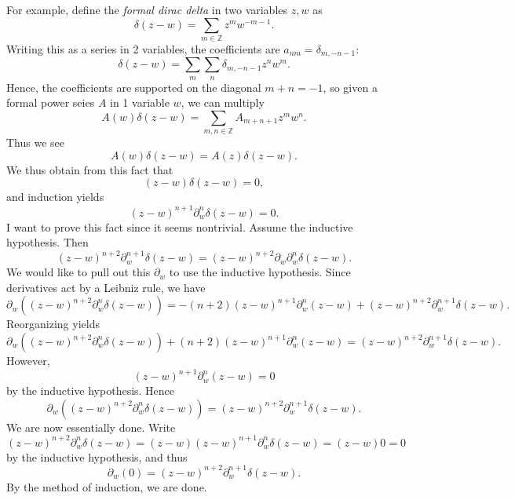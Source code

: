 For example, define the \emph{formal dirac delta} in two variables $z,w$ as
\[
	\delta (z-w) = \sum_{m\in\mathbb{Z} } z^m w^{-m-1} 
.\]
Writing this as a series in 2 variables, the coefficients are $a_{nm} =\delta _{m,-n-1} $:
\[
	\delta (z-w) = \sum_{m} \sum_{n} \delta _{m,-n-1} z^nw^{m} 
.\]
Hence, the coefficients are supported on the diagonal $m+n=-1$, so given a formal power seies $A$ in 1 variable $w$, we can multiply
\[
	A(w)\delta (z-w) = \sum_{m,n\in\mathbb{Z} } A_{m+n+1} z^mw^n
.\]
Thus we see
\[
	A(w)\delta (z-w) = A(z)\delta (z-w)
.\]
We thus obtain from this fact that
\[
	(z-w)\delta (z-w)=0,
\]
and induction yields
\[
	(z-w)^{n+1} \partial ^n_w \delta (z-w)=0
.\]
I want to prove this fact since it seems nontrivial. Assume the inductive hypothesis. Then
\[
	(z-w)^{n+2} \partial _{w} ^{n+1} \delta (z-w) = (z-w)^{n+2} \partial _w \partial _w^{n} \delta (z-w)
.\]
We would like to pull out this $\partial _w$ to use the inductive hypothesis. Since derivatives act by a Leibniz rule, we have
\[
	\partial _w\left( (z-w)^{n+2} \partial _w^n \delta (z-w) \right) =-(n+2)(z-w)^{n+1} \partial _w^n(z-w) + (z-w)^{n+2} \partial _w^{n+1} \delta (z-w)
.\]
Reorganizing yields
\[
	\partial _w\left( (z-w)^{n+2} \partial _w^n \delta (z-w) \right) + (n+2)(z-w)^{n+1} \partial _w^n(z-w) = (z-w)^{n+2} \partial _w^{n+1} \delta (z-w)
.\]
However,
\[
	(z-w)^{n+1} \partial _w^n(z-w)=0
\]
by the inductive hypothesis. Hence
\[
	\partial _w\left( (z-w)^{n+2} \partial _w^n \delta (z-w) \right) = (z-w)^{n+2} \partial _w^{n+1} \delta (z-w)
.\]
We are now essentially done. Write
\[
	(z-w)^{n+2} \partial _w^n\delta (z-w) = (z-w)(z-w)^{n+1} \partial _w^n \delta (z-w) = (z-w)0=0
\]
by the inductive hypothesis, and thus
\[
	\partial _w(0) = (z-w)^{n+2} \partial _w^{n+1} \delta (z-w)
.\]
By the method of induction, we are done.

